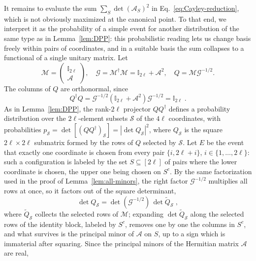 \documentclass[aps,prl,twocolumn,superscriptaddress,reprint,longbibliography,nofootinbib]{revtex4-2}
\begin{document}
It remains to evaluate the sum $\sum_S\det(\mathcal{A}_S)^2$ in Eq.~\eqref{eq:Cayley-reduction}, which is not obviously maximized at the canonical point. To that end, we interpret it as the probability of a simple event for another distribution of the same type as in Lemma~\ref{lem:DPP}: this probabilistic reading lets us change basis freely within pairs of coordinates, and in a suitable basis the sum collapses to a functional of a single unitary matrix. Let
\begin{equation}\mathcal{M}=\begin{pmatrix}\mathbb{I}_{2\ell}\\ \mathcal{A}\end{pmatrix},\quad \mathcal{G}=\mathcal{M}^\dagger \mathcal{M}=\mathbb{I}_{2\ell}+\mathcal{A}^2,\quad Q=\mathcal{M}\mathcal{G}^{-1/2}.
\end{equation}
The columns of $Q$ are orthonormal, since
\begin{equation}
Q^\dagger Q=\mathcal{G}^{-1/2}\left(\mathbb{I}_{2\ell}+\mathcal{A}^2\right)\mathcal{G}^{-1/2}=\mathbb{I}_{2\ell}\;.
\end{equation}
As in Lemma~\ref{lem:DPP}, the rank-$2\ell$ projector $QQ^\dagger$ defines a probability distribution over the $2\ell$-element subsets $\mathcal{S}$ of the $4\ell$ coordinates, with probabilities $p_{\mathcal{S}}=\det[(QQ^\dagger)_{\mathcal{S}}]=|\det Q_{\mathcal{S}}|^2$, where $Q_{\mathcal{S}}$ is the square $2\ell\times2\ell$ submatrix formed by the rows of $Q$ selected by $\mathcal{S}$. Let $E$ be the event that exactly one coordinate is chosen from every pair $\{i,2\ell+i\}$, $i\in\{1,\dots,2\ell\}$: such a configuration is labeled by the set $S\subseteq[2\ell]$ of pairs where the lower coordinate is chosen, the upper one being chosen on $S^c$. By the same factorization used in the proof of Lemma~\ref{lem:all-minors}, the right factor $\mathcal{G}^{-1/2}$ multiplies all rows at once, so it factors out of the square determinant,
\begin{equation}
\det Q_{\mathcal{S}}=\det(\mathcal{G}^{-1/2})\,\det\widetilde Q_{\mathcal{S}}\;,
\end{equation}
where $\widetilde Q_{\mathcal{S}}$ collects the selected rows of $\mathcal{M}$; expanding $\det\widetilde Q_{\mathcal{S}}$ along the selected rows of the identity block, labeled by $S^c$, removes one by one the columns in $S^c$, and what survives is the principal minor of $\mathcal{A}$ on $S$, up to a sign which is immaterial after squaring. Since the principal minors of the Hermitian matrix $\mathcal{A}$ are real,
\end{document}

